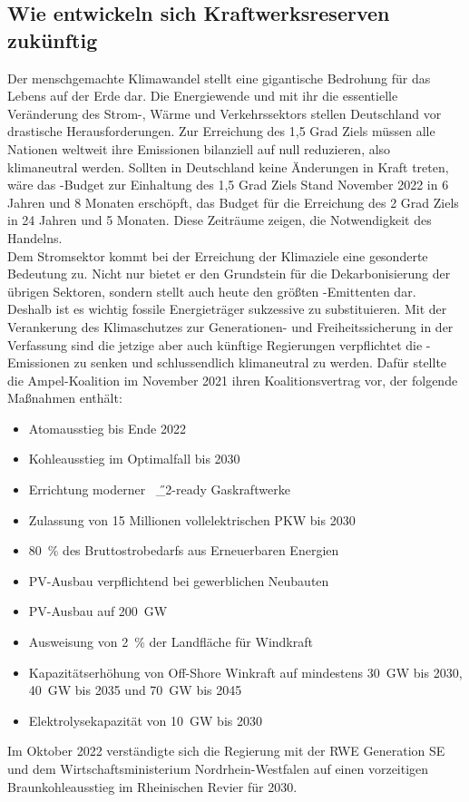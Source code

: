 		
	\subsection{Wie entwickeln sich Kraftwerksreserven zukünftig}	
	Der menschgemachte Klimawandel stellt eine gigantische Bedrohung für das Lebens auf der Erde dar. Die Energiewende und mit ihr die essentielle Veränderung des Strom-, Wärme und Verkehrssektors stellen Deutschland vor drastische Herausforderungen. Zur Erreichung des 1,5 Grad Ziels müssen alle Nationen weltweit ihre Emissionen bilanziell auf null reduzieren, also klimaneutral werden. Sollten in Deutschland keine Änderungen in Kraft treten, wäre das \SI{}{\COtwo}-Budget zur Einhaltung des 1,5 Grad Ziels Stand November 2022 in 6 Jahren und 8 Monaten erschöpft, das Budget für die Erreichung des 2 Grad Ziels in 24 Jahren und 5 Monaten. Diese Zeiträume zeigen, die Notwendigkeit des Handelns.\cite{CO2_Uhr} \\
	
	Dem Stromsektor kommt bei der Erreichung der Klimaziele eine gesonderte Bedeutung zu. Nicht nur bietet er den Grundstein für die Dekarbonisierung der übrigen Sektoren, sondern stellt auch heute den größten \SI{}{\COtwo}-Emittenten dar.\cite{Umweltbundesamt_Emissionen} Deshalb ist es wichtig fossile Energieträger sukzessive zu substituieren. Mit der Verankerung des Klimaschutzes zur Generationen- und Freiheitssicherung in der Verfassung sind die jetzige aber auch künftige Regierungen verpflichtet die \SI{}{\COtwo}-Emissionen zu senken und schlussendlich klimaneutral zu werden. Dafür stellte die Ampel-Koalition im November 2021 ihren Koalitionsvertrag vor, der folgende Maßnahmen enthält\cite{Koalitionsvertrag}:
		\begin{itemize}
			\item Atomausstieg bis Ende 2022
			\item Kohleausstieg im Optimalfall bis 2030
			\item Errichtung moderner \SI{}{\H{_2}}-ready Gaskraftwerke
			\item Zulassung von 15 Millionen vollelektrischen PKW bis 2030
			\item \SI{80}{\percent} des Bruttostrobedarfs aus Erneuerbaren Energien
			\item PV-Ausbau verpflichtend bei gewerblichen Neubauten
			\item PV-Ausbau auf \SI{200}{\giga \watt}
			\item Ausweisung von \SI{2}{\percent} der Landfläche für Windkraft
			\item Kapazitätserhöhung von Off-Shore Winkraft auf mindestens \SI{30}{\giga \watt} bis 2030, \SI{40}{\giga \watt} bis 2035 und \SI{70}{\giga \watt} bis 2045
			\item Elektrolysekapazität von \SI{10}{\giga \watt} bis 2030
		\end{itemize}
		Im Oktober 2022 verständigte sich die Regierung mit der RWE Generation SE und dem Wirtschaftsministerium Nordrhein-Westfalen auf einen vorzeitigen Braunkohleausstieg im Rheinischen Revier für 2030.\cite{Kohleausstieg_RWE} \\
		
